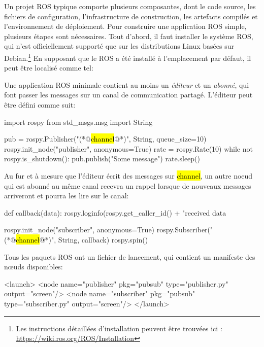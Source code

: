 Un projet ROS typique comporte plusieurs composantes, dont le code source, les fichiers de configuration, l'infrastructure de construction, les artefacts compilés et l'environnement de déploiement. Pour construire une application ROS simple, plusieurs étapes sont nécessaires. Tout d'abord, il faut installer le système ROS, qui n'est officiellement supporté que sur les distributions Linux basées sur Debian.\hspace{-.08em}\footnote{Les instructions détaillées d'installation peuvent être trouvées ici : \url{https://wiki.ros.org/ROS/Installation}}
%
En supposant que le ROS a été installé à l'emplacement par défaut, il peut être localisé comme tel:
%
%
Une application ROS minimale contient au moins un \textit{éditeur} et un \textit{abonné}, qui font passer les messages sur un canal de communication partagé. L'éditeur peut être défini comme suit:
%
\begin{pythonlisting}[title=./catkin\_ws/src/pubsub/publisher.py]
import rospy
from std_msgs.msg import String

pub = rospy.Publisher("(*@\hl{channel}@*)", String, queue_size=10)
rospy.init_node("publisher", anonymous=True)
rate = rospy.Rate(10)
while not rospy.is_shutdown():
pub.publish("Some message")
rate.sleep()
\end{pythonlisting}
%
Au fur et à mesure que l'éditeur écrit des messages sur \hl{\ttfamily\small channel}, un autre noeud qui est abonné au même canal recevra un rappel lorsque de nouveaux messages arriveront et pourra les lire sur le canal:
%
\begin{pythonlisting}[title=./catkin\_ws/src/pubsub/subscriber.py]
def callback(data):
    rospy.loginfo(rospy.get_caller_id() + "received data %

    rospy.init_node("subscriber", anonymous=True)
    rospy.Subscriber("(*@\hl{channel}@*)", String, callback)
    rospy.spin()
\end{pythonlisting}
%
Tous les paquets ROS ont un fichier de lancement, qui contient un manifeste des nœuds disponibles:
%
\begin{launchlisting}[title=./catkin\_ws/src/pubsub/pubsub.launch]
<launch>
<node name="publisher" pkg="pubsub" type="publisher.py" output="screen"/>
<node name="subscriber" pkg="pubsub" type="subscriber.py" output="screen"/>
</launch>
\end{launchlisting}
